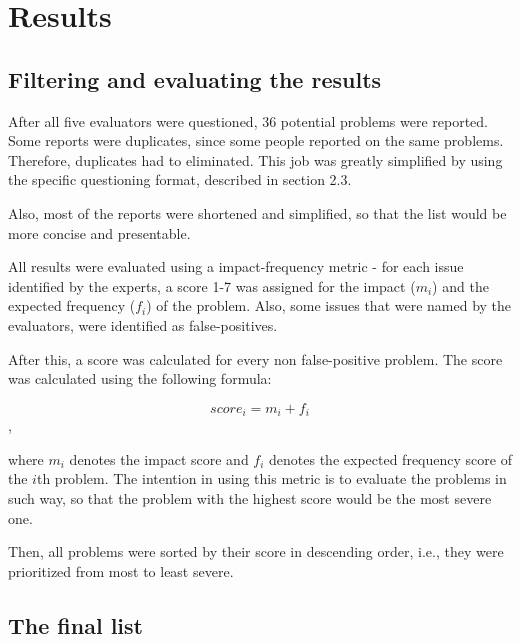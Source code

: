 \section{Results}

\subsection{Filtering and evaluating the results}
After all five evaluators were questioned, 36 potential problems were reported. Some reports were duplicates, since some people reported on the same problems. Therefore, duplicates had to eliminated. This job was greatly simplified by using the specific questioning format, described in section 2.3.

Also, most of the reports were shortened and simplified, so that the list would be more concise and presentable.

All results were evaluated using a impact-frequency metric - for each issue identified by the experts, a score 1-7 was assigned for the impact ($m_i$) and the expected frequency ($f_i$) of the problem. Also, some issues that were named by the evaluators, were identified as false-positives.

After this, a score was calculated for every non false-positive problem. The score was calculated using the following formula:

$$score_i = m_i + f_i$$, 

where $m_i$ denotes the impact score and $f_i$ denotes the expected frequency score of the $i$th problem. The intention in using this metric is to evaluate the problems in such way, so that the problem with the highest score would be the most severe one.

Then, all problems were sorted by their score in descending order, i.e., they were prioritized from most to least severe.

\subsection{The final list}

